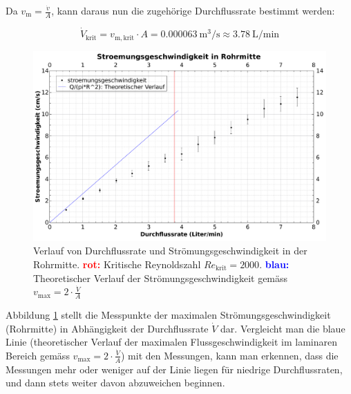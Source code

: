 Da $v_{\mathrm{m}} = \frac{\dot{v}}{A}$, kann daraus nun die zugeh\"orige Durchflussrate
bestimmt werden:

\begin{equation}
    \label{eq:Q:reynolds_krit}
    \dot{V}_{\mathrm{krit}} = v_{\mathrm{m,krit}} \cdot A = \SI{0.000063}{\cubic\meter\per\second} \approx \SI{3.78}{\liter\per\minute}
\end{equation}

\begin{figure}
    \centering
    \includegraphics[width=\textwidth]{images/rohrmitte.pdf}
    \caption{%
        Verlauf    von     Durchflussrate    und    Str\"omungsgeschwindigkeit
        in     der     Rohrmitte.     \textcolor{red}{\textbf{rot:}} Kritische
        Reynoldszahl        $\mathit{Re}_{\mathrm{krit}}       =        2000$.
        \textcolor{blue}{\textbf{blau:}} Theoretischer    Verlauf    der
        Str\"omungsgeschwindigkeit  gem\"ass   $v_{\mathrm{max}}  =   2  \cdot
        \frac{\dot{V}}{A}$
    }
    \label{fig:flowspeed:middle}
\end{figure}

Abbildung  \ref{fig:flowspeed:middle}  stellt  die  Messpunkte  der  maximalen
Str\"omungsgeschwindigkeit  (Rohrmitte) in  Abh\"angigkeit der  Durchflussrate
$\dot{V}$  dar.  Vergleicht  man die  blaue Linie  (theoretischer Verlauf  der
maximalen Flussgeschwindigkeit im laminaren Bereich gem\"ass $v_{\mathrm{max}}
=  2 \cdot  \frac{\dot{V}}{A}$) mit  den  Messungen, kann  man erkennen,  dass
die  Messungen  mehr  oder  weniger   auf  der  Linie  liegen  f\"ur  niedrige
Durchflussraten, und dann stets weiter davon abzuweichen beginnen.



